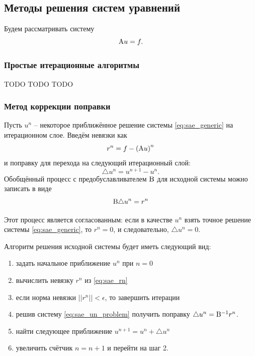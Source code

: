 \subsection{Методы решения систем уравнений}
Будем рассматривать систему 
\begin{equation}
\label{eq:sae_generic}
{\rm A} u = f.
\end{equation}

\subsubsection{Простые итерационные алгоритмы}
\label{sec:sae_simple}
\label{sec:sae_jacobi}
TODO
\label{sec:sae_seidel}
TODO
\label{sec:sae_sor}
TODO
\subsubsection{Метод коррекции поправки}
\label{sec:it_def_corr}
Пусть $u^n$ -- некоторое приближённое решение системы \cref{eq:sae_generic} на итерационном слое.
Введём невязки как
\begin{equation}
\label{eq:sae_rn}
r^n = f - \left({\rm A} u\right)^n
\end{equation}
и поправку для перехода на следующий итерационный слой:
\begin{equation*}
\triangle u^n = u^{n+1} - u^{n}.
\end{equation*}
Обобщённый процесс с предобуславливателем ${\rm B}$ для исходной системы можно записать в виде
\begin{equation}
\label{eq:sae_un_problem}
{\rm B} \triangle u^n = r^n
\end{equation}

Этот процесс является согласованным: если в качестве $u^n$ взять точное решение системы \cref{eq:sae_generic},
то $r^n = 0$, и следовательно, $\triangle u^n = 0$.

Алгоритм решения исходной системы будет иметь следующий вид:
\begin{enumerate}
\item задать начальное приближение $u^n$ при $n=0$
\item вычислить невязку $r^n$ из \cref{eq:sae_rn}
\item если норма невязки $||r^n|| < \epsilon$, то завершить итерации
\item решив систему \cref{eq:sae_un_problem} получить поправку $\triangle u^n = {\rm B}^{-1} r^n$.
\item найти следующее приближение $u^{n+1} = u^{n} + \triangle u^{n}$
\item увеличить счётчик $n = n + 1$ и перейти на шаг 2.
\end{enumerate}

